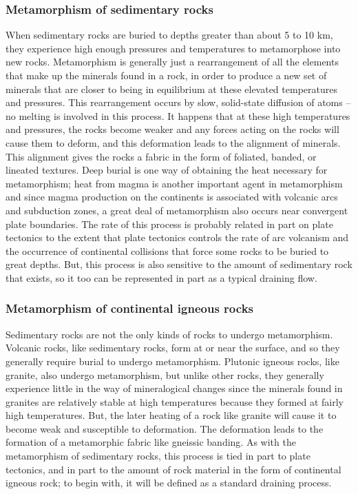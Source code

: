\documentclass[11pt,letterpaper]{article}
\begin{document}
\subsubsection{Metamorphism of sedimentary rocks}
When sedimentary rocks are buried to depths greater than about 5 to 10 km, they experience high enough pressures and temperatures to metamorphose into new rocks. Metamorphism is generally just a rearrangement of all the elements that make up the minerals found in a rock, in order to produce a new set of minerals that are closer to being in equilibrium at these elevated temperatures and pressures. This rearrangement occurs by slow, solid-state diffusion of atoms -- no melting is involved in this process. It happens that at these high temperatures and pressures, the rocks become weaker and any forces acting on the rocks will cause them to deform, and this deformation leads to the alignment of minerals. This alignment gives the rocks a fabric in the form of foliated, banded, or lineated textures. Deep burial is one way of obtaining the heat necessary for metamorphism; heat from magma is another important agent in metamorphism and since magma production on the continents is associated with volcanic arcs and subduction zones, a great deal of metamorphism also occurs near convergent plate boundaries. The rate of this process is probably related in part on plate tectonics to the extent that plate tectonics controls the rate of arc volcanism and the occurrence of continental collisions that force some rocks to be buried to great depths. But, this process is also sensitive to the amount of sedimentary rock that exists, so it too can be represented in part as a typical draining flow.

\subsubsection{Metamorphism of continental igneous rocks}
Sedimentary rocks are not the only kinds of rocks to undergo metamorphism. Volcanic rocks, like sedimentary rocks, form at or near the surface, and so they generally require burial to undergo metamorphism. Plutonic igneous rocks, like granite, also undergo metamorphism, but unlike other rocks, they generally experience little in the way of mineralogical changes since the minerals found in granites are relatively stable at high temperatures because they formed at fairly high temperatures. But, the later heating of a rock like granite will cause it to become weak and susceptible to deformation. The deformation leads to the formation of a metamorphic fabric like gneissic banding. As with the metamorphism of sedimentary rocks, this process is tied in part to plate tectonics, and in part to the amount of rock material in the form of continental igneous rock; to begin with, it will be defined as a standard draining process.
\end{document}
